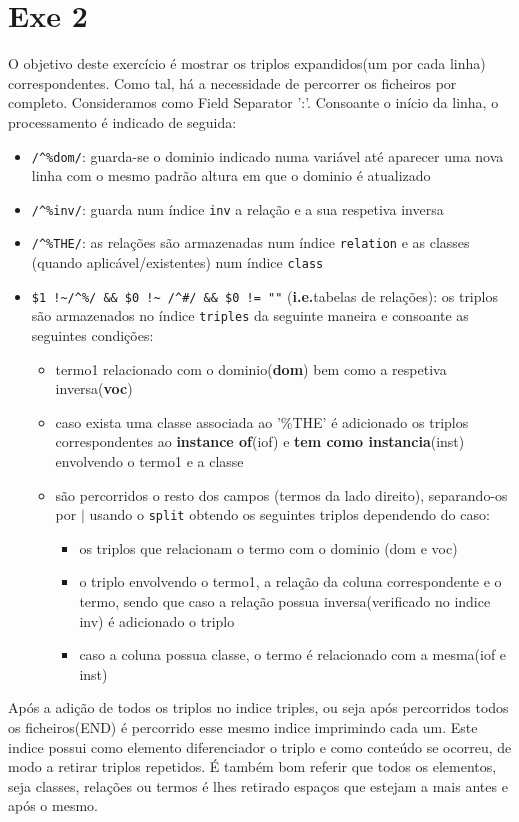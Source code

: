 \documentclass{llncs}
\begin{document}
\section{Exe 2}
O objetivo deste exercício é mostrar os triplos expandidos(um por cada linha) correspondentes. Como tal, há a necessidade de percorrer os ficheiros por completo. Consideramos como Field Separator ':'. Consoante o início da linha, o processamento é indicado de seguida:
\begin{itemize}
    \item \verb|/^%dom/|: guarda-se o dominio indicado numa variável até aparecer uma nova linha com o mesmo padrão altura em que o dominio é atualizado
    \item \verb|/^%inv/|: guarda num índice \texttt{inv} a relação e a sua respetiva inversa
    \item \verb|/^%THE/|: as relações são armazenadas num índice \texttt{relation} e as classes (quando aplicável/existentes) num índice \texttt{class}
    \item \verb|$1 !~/^%/ && $0 !~ /^#/ && $0 != ""| (\textbf{i.e.}tabelas de relações): os triplos são armazenados no índice \texttt{triples} da seguinte maneira e consoante as seguintes condições: 
        \begin{itemize}
            \item termo1 relacionado com o dominio(\textbf{dom}) bem como a respetiva inversa(\textbf{voc})
            \item caso exista uma classe associada ao '\%THE' é adicionado os triplos correspondentes ao \textbf{instance of}(iof) e \textbf{tem como instancia}(inst) envolvendo o termo1 e a classe
            \item são percorridos o resto dos campos (termos da lado direito), separando-os por $|$ usando o \texttt{split} obtendo os seguintes triplos dependendo do caso:
                \begin{itemize}
                    \item os triplos que relacionam o termo com o dominio (dom e voc)
                    \item o triplo envolvendo o termo1, a relação da coluna correspondente e o termo, sendo que caso a relação possua inversa(verificado no indice inv) é adicionado o triplo
                    \item caso a coluna possua classe, o termo é relacionado com a mesma(iof e inst)
                \end{itemize}
        \end{itemize}
\end{itemize}
Após a adição de todos os triplos no indice triples, ou seja após percorridos todos os ficheiros(END) é percorrido esse mesmo indice imprimindo cada um. Este indice possui como elemento diferenciador o triplo e como conteúdo se ocorreu, de modo a retirar triplos repetidos. É também bom referir que todos os elementos, seja classes, relações ou termos é lhes retirado espaços que estejam a mais antes e após o mesmo.
\end{document}
